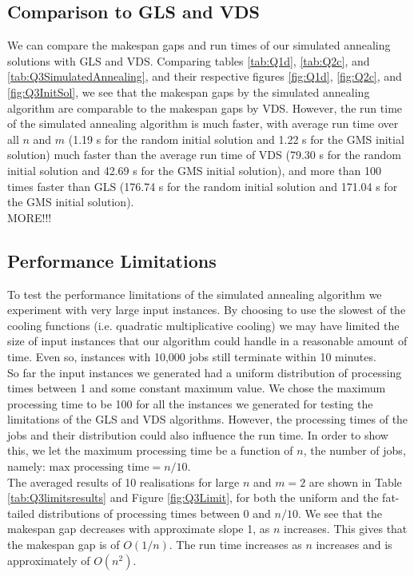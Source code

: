 \documentclass[12pt,a4paper,reqno]{article}
\begin{document}
\subsection{Comparison to GLS and VDS}
We can compare the makespan gaps and run times of our simulated annealing solutions with GLS and VDS. 
Comparing tables \ref{tab:Q1d}, \ref{tab:Q2c}, and \ref{tab:Q3SimulatedAnnealing}, and their respective figures \ref{fig:Q1d}, \ref{fig:Q2c}, and \ref{fig:Q3InitSol}, we see that the makespan gaps by the simulated annealing algorithm are comparable to the makespan gaps by VDS. However, the run time of the simulated annealing algorithm is much faster, with average run time over all $n$ and $m$ (1.19 s for the random initial solution and 1.22 s for the GMS initial solution) much faster than the average run time of VDS (79.30 s for the random initial solution and 42.69 s for the GMS initial solution), and more than 100 times faster than GLS (176.74 s for the random initial solution and 171.04 s for the GMS initial solution). \\

\color{red} MORE!!! \color{black}




\subsection{Performance Limitations}
To test the performance limitations of the simulated annealing algorithm we experiment with very large input instances. By choosing to use the slowest of the cooling functions (i.e. quadratic multiplicative cooling) we may have limited the size of input instances that our algorithm could handle in a reasonable amount of time. Even so, instances with 10,000 jobs still terminate within 10 minutes. \\

So far the input instances we generated had a uniform distribution of processing times between 1 and some constant maximum value. We chose the maximum processing time to be 100 for all the instances we generated for testing the limitations of the GLS and VDS algorithms. However, the processing times of the jobs and their distribution could also influence the run time. In order to show this, we let the maximum processing time be a function of $n$, the number of jobs, namely: $\text{max processing time}=n/10$. \\
The averaged results of 10 realisations for large $n$ and $m=2$ are shown in Table \ref{tab:Q3limitsresults} and Figure \ref{fig:Q3Limit}, for both the uniform and the fat-tailed distributions of processing times between 0 and $n/10$. We see that the makespan gap decreases with approximate slope 1, as $n$ increases. This gives that the makespan gap is of $O(1/n)$. The run time increases as $n$ increases and is approximately of $O(n^2)$. \\
\end{document}
